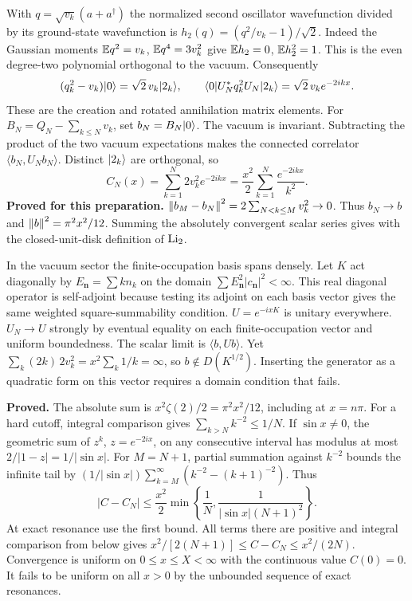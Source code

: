 With $q=\sqrt{v_k}(a+a^\dagger)$ the normalized second oscillator wavefunction divided by its ground-state wavefunction is
$h_2(q)=(q^2/v_k-1)/\sqrt{2}$. Indeed the Gaussian moments
$\mathbb E q^2=v_k$, $\mathbb E q^4=3v_k^2$ give $\mathbb E h_2=0$, $\mathbb E h_2^2=1$. This is the even degree-two polynomial orthogonal to the vacuum. Consequently
\[
 (q_k^2-v_k)\lvert 0\rangle=\sqrt{2}\,v_k\lvert 2_k\rangle,\qquad
 \langle 0\rvert U_N^*q_k^2U_N\lvert 2_k\rangle=\sqrt{2}\,v_k e^{-2ikx}.
\]
These are the creation and rotated annihilation matrix elements. For $B_N=Q_N-\sum_{k\le N}v_k$, set $b_N=B_N\lvert 0\rangle$. The vacuum is invariant. Subtracting the product of the two vacuum expectations makes the connected correlator $\langle b_N,U_N b_N\rangle$. Distinct $\lvert 2_k\rangle$ are orthogonal, so
\[
 C_N(x)=\sum_{k=1}^N 2v_k^2e^{-2ikx}
       =\frac{x^2}{2}\sum_{k=1}^N\frac{e^{-2ikx}}{k^2}.
\]
\textbf{Proved for this preparation.} $\left\lVert b_M-b_N\right\rVert^2=2\sum_{N<k\le M}v_k^2\to0$. Thus $b_N\to b$ and $\left\lVert b\right\rVert^2=\pi^2x^2/12$. Summing the absolutely convergent scalar series gives  with the closed-unit-disk definition of $\operatorname{Li}_2$.

In the vacuum sector the finite-occupation basis spans densely. Let $K$ act diagonally by $E_{\boldsymbol n}=\sum k n_k$ on the domain $\sum E_{\boldsymbol n}^2 |c_{\boldsymbol n}|^2<\infty$. This real diagonal operator is self-adjoint because testing its adjoint on each basis vector gives the same weighted square-summability condition. $U=e^{-ixK}$ is unitary everywhere. $U_N\to U$ strongly by eventual equality on each finite-occupation vector and uniform boundedness. The scalar limit is $\langle b,Ub\rangle$. Yet $\sum_k(2k)\,2v_k^2=x^2\sum_k1/k=\infty$, so $b\notin D(K^{1/2})$. Inserting the generator as a quadratic form on this vector requires a domain condition that fails.

\newpage
{}
\textbf{Proved.} The absolute sum is $x^2\zeta(2)/2=\pi^2x^2/12$, including at $x=n\pi$. For a hard cutoff, integral comparison gives $\sum_{k>N}k^{-2}\le1/N$. If $\sin x\ne0$, the geometric sum of $z^k$, $z=e^{-2ix}$, on any consecutive interval has modulus at most $2/|1-z|=1/|\sin x|$. For $M=N+1$, partial summation against $k^{-2}$ bounds the infinite tail by
$(1/|\sin x|)\sum_{k=M}^\infty(k^{-2}-(k+1)^{-2})$. Thus
\[
 |C-C_N|\le\frac{x^2}{2}\min\!\left\{\frac1N,\frac{1}{|\sin x|(N+1)^2}\right\}.
\]
At exact resonance use the first bound. All terms there are positive and integral comparison from below gives $x^2/[2(N+1)]\le C-C_N\le x^2/(2N)$. Convergence is uniform on $0\le x\le X<\infty$ with the continuous value $C(0)=0$. It fails to be uniform on all $x>0$ by the unbounded sequence of exact resonances.

